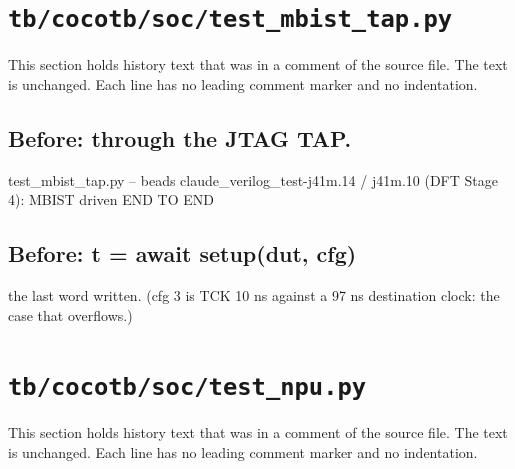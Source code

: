 \section{\texttt{tb/cocotb/soc/test\_mbist\_tap.py}}\label{cr:suite:soc-test-mbist-tap}

This section holds history text that was in a comment of the source file. The text is unchanged. Each line has no leading comment marker and no indentation.

\begin{record}

\subsection*{Before: through the JTAG TAP.}

\begin{textblock}
test_mbist_tap.py -- beads claude_verilog_test-j41m.14 / j41m.10 (DFT Stage 4): MBIST driven END TO END
\end{textblock}

\subsection*{Before: t = await setup(dut, cfg)}

\begin{textblock}
the last word written. (cfg 3 is TCK 10 ns against a 97 ns destination clock: the case that overflows.)
\end{textblock}

\end{record}

\section{\texttt{tb/cocotb/soc/test\_npu.py}}\label{cr:suite:soc-test-npu}

This section holds history text that was in a comment of the source file. The text is unchanged. Each line has no leading comment marker and no indentation.

